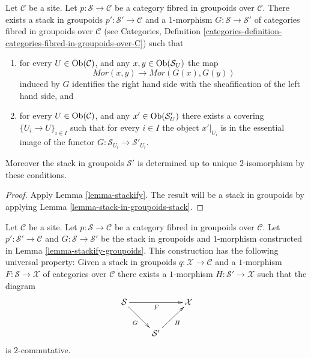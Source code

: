 \begin{lemma}
\label{lemma-stackify-groupoids}
Let $\mathcal{C}$ be a site.
Let $p : \mathcal{S} \to \mathcal{C}$ be a category
fibred in groupoids over $\mathcal{C}$.
There exists a stack in groupoids
$p' : \mathcal{S}' \to \mathcal{C}$ and a
$1$-morphism $G : \mathcal{S} \to \mathcal{S}'$
of categories fibred in groupoids over $\mathcal{C}$ (see
Categories, Definition
\ref{categories-definition-categories-fibred-in-groupoids-over-C})
such that
\begin{enumerate}
\item for every $U \in \mathop{\mathrm{Ob}}\nolimits(\mathcal{C})$, and any
$x, y \in \mathop{\mathrm{Ob}}\nolimits(\mathcal{S}_U)$ the map
$$
\mathit{Mor}(x, y) \longrightarrow \mathit{Mor}(G(x), G(y))
$$
induced by $G$ identifies the right hand side with the sheafification
of the left hand side, and
\item for every $U \in \mathop{\mathrm{Ob}}\nolimits(\mathcal{C})$, and any
$x' \in \mathop{\mathrm{Ob}}\nolimits(\mathcal{S}'_U)$ there exists a covering
$\{U_i \to U\}_{i \in I}$ such that for every $i \in I$ the
object $x'|_{U_i}$ is in the essential image of the
functor $G : \mathcal{S}_{U_i} \to \mathcal{S}'_{U_i}$.
\end{enumerate}
Moreover the stack in groupoids $\mathcal{S}'$ is determined up to unique
$2$-isomorphism by these conditions.
\end{lemma}

\begin{proof}
Apply Lemma \ref{lemma-stackify}. The result will be a
stack in groupoids by applying Lemma \ref{lemma-stack-in-groupoids-stack}.
\end{proof}

\begin{lemma}
\label{lemma-stackify-groupoids-universal-property}
Let $\mathcal{C}$ be a site.
Let $p : \mathcal{S} \to \mathcal{C}$ be a category fibred in groupoids
over $\mathcal{C}$. Let $p' : \mathcal{S}' \to \mathcal{C}$ and
$G : \mathcal{S} \to \mathcal{S}'$
be the stack in groupoids and $1$-morphism constructed in
Lemma \ref{lemma-stackify-groupoids}.
This construction has the following universal property: Given a stack
in groupoids $q : \mathcal{X} \to \mathcal{C}$ and a $1$-morphism
$F : \mathcal{S} \to \mathcal{X}$ of categories over $\mathcal{C}$
there exists a $1$-morphism $H : \mathcal{S}' \to \mathcal{X}$
such that the diagram
$$
\xymatrix{
\mathcal{S} \ar[rr]_F \ar[rd]_G & & \mathcal{X} \\
& \mathcal{S}' \ar[ru]_H
}
$$
is $2$-commutative.
\end{lemma}

